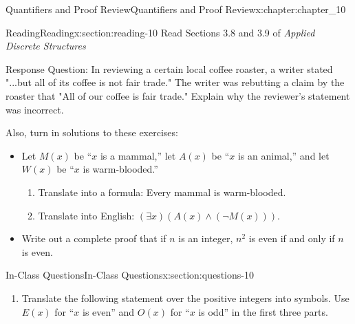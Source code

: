\documentclass[oneside,10pt,]{book}
\numberwithin{equation}{section}
\begin{document}
%
%
\typeout{************************************************}
\typeout{************************************************}
%
\begin{chapterptx}{Quantifiers and Proof Review}{}{Quantifiers and Proof Review}{}{}{x:chapter:chapter_10}
\index{}%
%
%
\typeout{************************************************}
\typeout{************************************************}
%
\begin{sectionptx}{Reading}{}{Reading}{}{}{x:section:reading-10}
Read Sections 3.8 and 3.9 of \emph{Applied Discrete Structures}%
\par
Response Question: In reviewing a certain local coffee roaster, a writer stated  "...but all of its coffee is not fair trade." The writer was rebutting a claim by the roaster that "All of our coffee is fair trade."  Explain why the reviewer's statement was incorrect.%
\par
Also, turn in solutions to these exercises:%
\begin{itemize}[label=\textbullet]
\item{}Let \(M(x)\) be ``\(x\) is a mammal,'' let \(A(x)\) be ``\(x\) is an animal,'' and let \(W(x)\) be ``\(x\) is warm-blooded.''%
\par
%
\begin{enumerate}[label=(\alph*)]
\item{}Translate into a formula: Every mammal is warm-blooded.%
\item{}Translate into English: \((\exists x)(A(x) \land  (\neg M(x)))\).%
\end{enumerate}
%
\item{}Write out a complete proof that if \(n\) is an integer, \(n^2\) is even if and only if \(n\) is even.%
\end{itemize}
%
\end{sectionptx}
%
%
\typeout{************************************************}
\typeout{************************************************}
%
\begin{sectionptx}{In-Class Questions}{}{In-Class Questions}{}{}{x:section:questions-10}
%
\begin{enumerate}[label=\arabic*.]
\item{}Translate the following statement over the positive integers into symbols. Use \(E(x)\) for ``\(x\) is even'' and \(O(x)\) for ``\(x\) is odd'' in the first three parts.%
\begin{enumerate}[label=(\alph*)]

\end{enumerate}
\end{enumerate}
\end{sectionptx}
\end{chapterptx}
\end{document}
